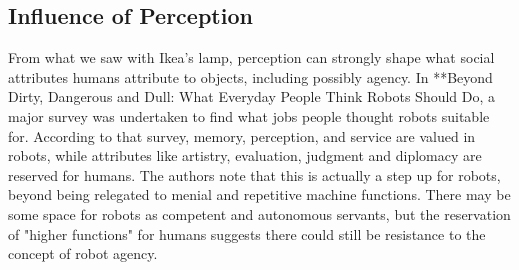 \documentclass{sfuthesis}
\begin{document}









\subsection{Influence of Perception}

From what we saw with Ikea's lamp, perception can strongly shape what social attributes humans attribute to objects, including possibly agency. In **Beyond Dirty, Dangerous and Dull: What Everyday People Think Robots Should Do, a major survey was undertaken to find what jobs people thought robots suitable for. According to that survey, memory, perception, and service are valued in robots, while attributes like artistry, evaluation, judgment and diplomacy are reserved for humans. The authors note that this is actually a step up for robots, beyond being relegated to menial and repetitive machine functions. There may be some space for robots as competent and autonomous servants, but the reservation of "higher functions" for humans suggests there could still be resistance to the concept of robot agency.
\end{document}
